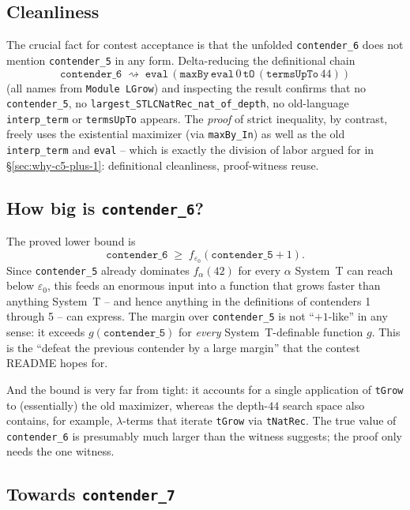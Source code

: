 \documentclass[11pt,a4paper]{article}
\theoremstyle{plain}
\theoremstyle{definition}
\theoremstyle{remark}
\begin{document}
\subsection{Cleanliness}

The crucial fact for contest acceptance is that the unfolded
\texttt{contender\_6} does not mention \texttt{contender\_5} in any
form.  Delta-reducing the definitional chain
\[
  \texttt{contender\_6}
  \;\rightsquigarrow\;
  \texttt{eval}\,(\texttt{maxBy}\,\texttt{eval}\,0\,\texttt{tO}\,(\texttt{termsUpTo}\,44))
\]
(all names from \texttt{Module LGrow}) and inspecting the result
confirms that no \texttt{contender\_5}, no
\texttt{largest\_STLCNatRec\_nat\_of\_depth}, no old-language
\texttt{interp\_term} or \texttt{termsUpTo} appears.  The
\emph{proof} of strict inequality, by contrast, freely uses the
existential maximizer (via \texttt{maxBy\_In}) as well as the old
\texttt{interp\_term} and \texttt{eval} -- which is exactly the
division of labor argued for in \S\ref{sec:why-c5-plus-1}:
definitional cleanliness, proof-witness reuse.

\subsection{How big is \texttt{contender\_6}?}

The proved lower bound is
\[
   \texttt{contender\_6}
   \;\geq\;
   f_{\varepsilon_0}(\texttt{contender\_5}+1).
\]
Since \texttt{contender\_5} already dominates $f_\alpha(42)$ for
every $\alpha$ System~T can reach below $\varepsilon_0$, this feeds
an enormous input into a function that grows faster than anything
System~T -- and hence anything in the definitions of contenders 1
through 5 -- can express.  The margin over \texttt{contender\_5} is
not ``$+1$-like'' in any sense: it exceeds
$g(\texttt{contender\_5})$ for \emph{every} System~T-definable
function $g$.  This is the ``defeat the previous contender by a large
margin'' that the contest README hopes for.

And the bound is very far from tight: it accounts for a single
application of \texttt{tGrow} to (essentially) the old maximizer,
whereas the depth-$44$ search space also contains, for example,
$\lambda$-terms that iterate \texttt{tGrow} via \texttt{tNatRec}.
The true value of \texttt{contender\_6} is presumably much larger
than the witness suggests; the proof only needs the one witness.

\subsection{Towards \texttt{contender\_7}}
\end{document}
